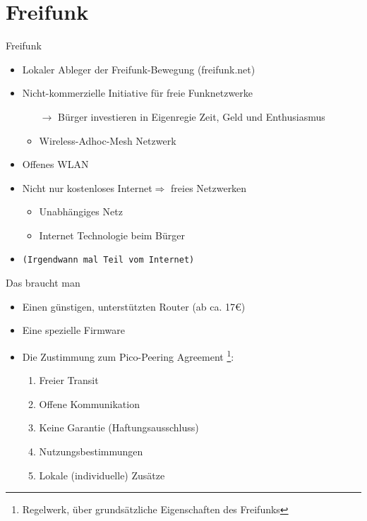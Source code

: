 \section{Freifunk}

\begin{frame}{Freifunk}
    \begin{itemize}
        \item Lokaler Ableger der Freifunk-Bewegung (freifunk.net)
        \item Nicht-kommerzielle Initiative für freie Funknetzwerke
        \begin{itemize}
            \item[$\rightarrow$] Bürger investieren in Eigenregie Zeit, Geld und Enthusiasmus
            \item Wireless-Adhoc-Mesh Netzwerk
        \end{itemize}
        \item Offenes WLAN
        \item Nicht nur \glqq{}kostenloses Internet\grqq $\Rightarrow$ \glqq{}freies Netzwerken\grqq\\
        \begin{itemize}
            \item Unabhängiges Netz
            \item Internet Technologie beim Bürger
        \end{itemize}
        \item \texttt{(Irgendwann mal Teil vom Internet)}
    \end{itemize}
\end{frame}

\begin{frame}{Das braucht man}
    \begin{itemize}
        \item Einen günstigen, unterstützten Router (ab ca. 17€)
        \item Eine spezielle Firmware
        \item Die Zustimmung zum \glqq{}Pico-Peering Agreement\grqq
            \footnote{Regelwerk, über grundsätzliche Eigenschaften des Freifunks}:
            \begin{enumerate}
                \item Freier Transit
                \item Offene Kommunikation
                \item Keine Garantie (Haftungsausschluss)
                \item Nutzungsbestimmungen
                \item Lokale (individuelle) Zusätze
            \end{enumerate}
    \end{itemize}
\end{frame}

